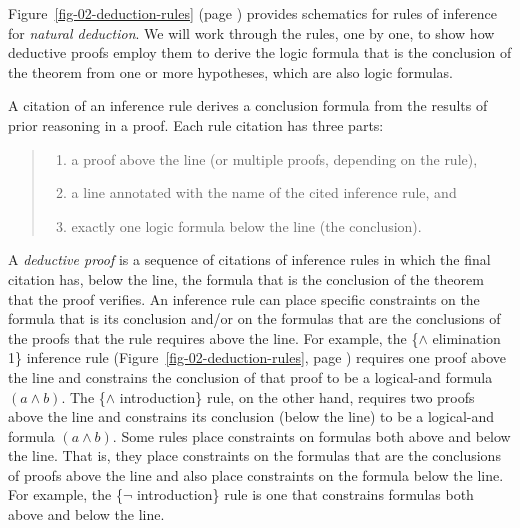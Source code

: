 Figure~\ref{fig-02-deduction-rules} (page \pageref{fig-02-deduction-rules})
provides schematics for rules of inference for \emph{natural deduction}.
We will work through the rules, one by one,
to show how deductive proofs employ
them to derive the logic formula that is the conclusion of the theorem
from one or more hypotheses, which are also logic formulas.

A citation of an inference rule derives a conclusion formula
from the results of prior reasoning in a proof.
Each rule
citation has three parts:
\begin{quote}
\begin{enumerate}
\item a proof above the line (or multiple proofs, depending on the rule),
\item a line annotated with the name of the cited inference rule, and
\item exactly one logic formula below the line (the conclusion).
\end{enumerate}
\end{quote}

\label{def-deductive-proof}
A \emph{deductive proof} is a sequence of citations of inference rules
in which the final citation has, below the line,
the formula that is the conclusion of the theorem that the proof verifies.
An inference rule can place specific constraints on the formula
that is its conclusion and/or on the formulas that are the
conclusions of the proofs that the rule requires above the line.
For example, the \{$\wedge$ elimination 1\} inference rule
(Figure~\ref{fig-02-deduction-rules}, page \pageref{fig-02-deduction-rules})
requires one proof
above the line
and constrains the conclusion of that proof
to be a logical-and formula $(a \wedge b)$.
The \{$\wedge$ introduction\} rule, on the other hand,
requires two proofs above the line and
constrains its conclusion (below the line)
to be a logical-and formula $(a \wedge b)$.
Some rules place constraints on formulas both
above and below the line.
That is, they place constraints on the formulas
that are the conclusions of proofs above the line
and also place constraints
on the formula below the
line.
For example, the \{$\neg$ introduction\} rule is one that
constrains formulas both above and below the line.

